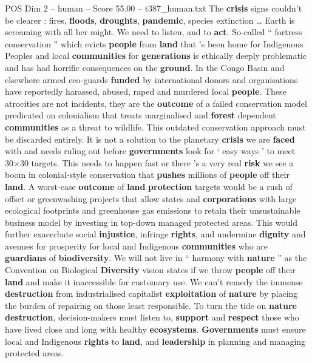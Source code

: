 \begin{textsample}{POS Dim 2 – human – Score 55.00 – t387\_human.txt}  \label{ex:f2_pos_024}
The \textbf{crisis} signs couldn't be clearer : fires, \textbf{floods}, \textbf{droughts}, \textbf{pandemic}, species extinction … Earth is screaming with all her might.
We need to listen, and to \textbf{act}.
So-called “ fortress conservation ” which evicts \textbf{people} from \textbf{land} that ’s been home for Indigenous Peoples and local \textbf{communities} for \textbf{generations} is ethically deeply problematic and has had horrific consequences on the \textbf{ground}.
In the Congo Basin and elsewhere armed eco-guards \textbf{funded} by international donors and organisations have reportedly harassed, abused, raped and murdered local \textbf{people}.
These atrocities are not incidents, they are the \textbf{outcome} of a failed conservation model predicated on colonialism that treats marginalised and \textbf{forest} dependent \textbf{communities} as a threat to wildlife.
This outdated conservation approach must be discarded entirely.
It is not a solution to the planetary \textbf{crisis} we are \textbf{faced} with and needs ruling out before \textbf{governments} look for ‘ easy ways ’ to meet 30×30 targets.
This needs to happen fast or there ’s a very real \textbf{risk} we see a boom in colonial-style conservation that \textbf{pushes} millions of \textbf{people} off their \textbf{land}.
A worst-case \textbf{outcome} of \textbf{land} \textbf{protection} targets would be a rush of offset or greenwashing projects that allow states and \textbf{corporations} with large ecological footprints and greenhouse gas emissions to retain their unsustainable business model by investing in top-down managed protected areas.
This would further exacerbate social \textbf{injustice}, infringe \textbf{rights}, and undermine \textbf{dignity} and avenues for prosperity for local and Indigenous \textbf{communities} who are \textbf{guardians} of \textbf{biodiversity}.
We will not live in “ harmony with \textbf{nature} ” as the Convention on Biological \textbf{Diversity} vision states if we throw \textbf{people} off their \textbf{land} and make it inaccessible for customary use.
We can't remedy the immense \textbf{destruction} from industrialised capitalist \textbf{exploitation} of \textbf{nature} by placing the burden of repairing on those least responsible.
To turn the tide on \textbf{nature} \textbf{destruction}, decision-makers must listen to, \textbf{support} and \textbf{respect} those who have lived close and long with healthy \textbf{ecosystems}. \textbf{Governments} must ensure local and Indigenous \textbf{rights} to \textbf{land}, and \textbf{leadership} in planning and managing protected areas.

\end{textsample}
